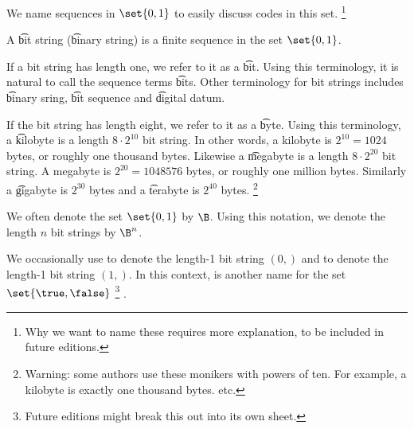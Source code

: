 

We name sequences in $\set{0, 1}$ to easily discuss codes in this set.
  \ifhmode\unskip\fi\footnote{
Why we want to name these requires more explanation, to be included in future editions.
  }


A \t{bit string} (\t{binary string}) is a finite sequence in the set $\set{0, 1}$.

If a bit string has length one, we refer to it as a \t{bit}.
Using this terminology, it is natural to call the sequence terms \t{bits}.
Other terminology for bit strings includes \t{binary sring}, \t{bit sequence} and \t{digital datum}.

If the bit string has length eight, we refer to it as a \t{byte}.
Using this terminology, a \t{kilobyte} is a length $8 \cdot 2^{10}$ bit string.
In other words, a kilobyte is $2^{10} = 1024$ bytes, or roughly one thousand bytes.
Likewise a \t{megabyte} is a length $8 \cdot 2^{20}$ bit string.
A megabyte is $2^{20} = 1048576$ bytes, or roughly one million bytes.
Similarly a \t{gigabyte} is $2^{30}$ bytes and a \t{terabyte} is $2^{40}$ bytes.
  \ifhmode\unskip\fi\footnote{
Warning: some authors use these monikers with powers of ten. For example, a kilobyte is exactly one thousand bytes. etc.
  }


We often denote the set $\set{0,1}$ by $\B$.
Using this notation, we denote the length $n$ bit strings by $\B^n$.

We occasionally use \false to denote the length-1 bit string $(0,)$ and \true to denote the length-1 bit string $(1,)$.
In this context, \bool is another name for the set $\set{\true, \false}$
  \ifhmode\unskip\fi\footnote{
Future editions might break this out into its own sheet.
  }
.

\blankpage

